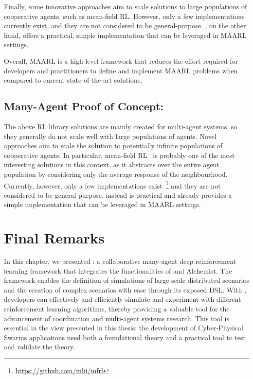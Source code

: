 Finally, some innovative approaches aim to scale solutions to large populations of cooperative agents, such as mean-field RL. However, only a few implementations currently exist, and they are not considered to be general-purpose. \scarlib{}, on the other hand, offers a practical, simple implementation that can be leveraged in \ac{MAARL} settings.

Overall, \ac{MAARL} is a high-level framework that reduces the effort required for developers and practitioners to define and implement \ac{MAARL} problems when compared to current state-of-the-art solutions.

\subsection{Many-Agent Proof of Concept:}
The above RL library solutions are mainly created for multi-agent systems, 
 so they generally do not scale well with large populations of agents. 
 Novel approaches aim to scale the solution to potentially infinite populations of cooperative agents. 
In particular, mean-field RL~\cite{meanfield} is probably one of the 
 most interesting solutions in this context, 
 as it abstracts over the entire agent population 
 by considering only the average response of the neighbourhood. 
%
Currently, however, only a few implementations 
 exist~\footnote{\url{https://github.com/mlii/mfrl}} and they are not considered to be general-purpose. 
 \scarlib{} instead is practical and already provides a simple implementation that can be leveraged in \ac{MAARL} settings. 
\section{Final Remarks}\label{coordination2023:conclusion}
In this chapter, we presented \scarlib{}: 
 a collaborative many-agent deep reinforcement learning framework that integrates the functionalities of \scafi{} and Alchemist.
%
 The framework enables the definition of simulations of large-scale distributed scenarios 
 and the creation of complex scenarios with ease through its exposed DSL. 
% 
With \scarlib{}, developers can effectively and efficiently simulate and experiment with different reinforcement learning algorithms, 
 thereby providing a valuable tool for the advancement of coordination and multi-agent systems research.
This tool is essential in the view presented in this thesis: 
 the development of Cyber-Physical Swarms applications need both a foundational theory and a practical tool to test and validate the theory.
%
%
%
%
